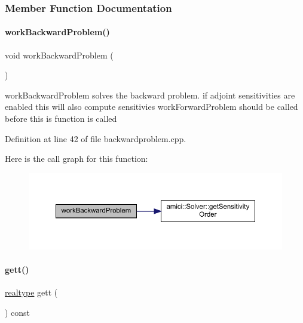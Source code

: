 \subsubsection{Member Function Documentation}
\mbox{\label{classamici_1_1_backward_problem_a4a17093ee76348cce97b06c94bf518bd}} 
\paragraph{\texorpdfstring{work\+Backward\+Problem()}{workBackwardProblem()}}
{\footnotesize\ttfamily void work\+Backward\+Problem (\begin{DoxyParamCaption}{ }\end{DoxyParamCaption})}

work\+Backward\+Problem solves the backward problem. if adjoint sensitivities are enabled this will also compute sensitivies work\+Forward\+Problem should be called before this is function is called

Definition at line 42 of file backwardproblem.\+cpp.

Here is the call graph for this function\+:
\nopagebreak
\begin{figure}[H]
\begin{center}
\leavevmode
\includegraphics[width=350pt]{classamici_1_1_backward_problem_a4a17093ee76348cce97b06c94bf518bd_cgraph}
\end{center}
\end{figure}
\mbox{\label{classamici_1_1_backward_problem_a1582a658df3f51a8c88b6f22b4205b3f}} 
\paragraph{\texorpdfstring{gett()}{gett()}}
{\footnotesize\ttfamily \mbox{\hyperlink{namespaceamici_a1bdce28051d6a53868f7ccbf5f2c14a3}{realtype}} gett (\begin{DoxyParamCaption}{ }\end{DoxyParamCaption}) const}

